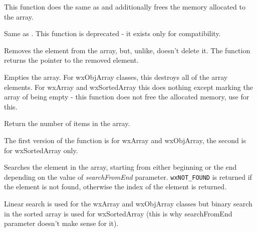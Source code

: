 \label{wxarrayclear}


This function does the same as  and additionally
frees the memory allocated to the array.

\label{wxarraycount}


Same as . This function is deprecated -
it exists only for compatibility.

\label{wxobjarraydetach}


Removes the element from the array, but, unlike,
 doesn't delete it. The function returns the
pointer to the removed element.

\label{wxarrayempty}


Empties the array. For wxObjArray classes, this destroys all of the array
elements. For wxArray and wxSortedArray this does nothing except marking the
array of being empty - this function does not free the allocated memory, use
 for this.

\label{wxarraygetcount}


Return the number of items in the array.

\label{wxarrayindex}



The first version of the function is for wxArray and wxObjArray, the second is
for wxSortedArray only.

Searches the element in the array, starting from either beginning or the end
depending on the value of {\it searchFromEnd} parameter. {\tt wxNOT\_FOUND} is
returned if the element is not found, otherwise the index of the element is
returned.

Linear search is used for the wxArray and wxObjArray classes but binary search
in the sorted array is used for wxSortedArray (this is why searchFromEnd
parameter doesn't make sense for it).

